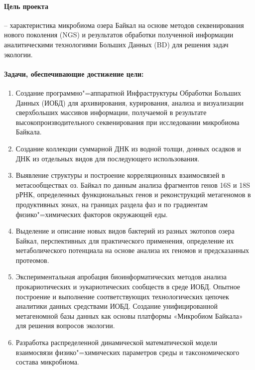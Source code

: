 \documentclass[a4paper,12pt,openany,final]{extreport}
\makeatletter
\def\vhrulefill#1{\leavevmode\leaders\hrule\@height#1\hfill \kern\z@}
\newcommand\toprule{\noindent\vhrulefill{2pt}}
\newcommand\bottomrule{\noindent\vhrulefill{2pt}}
\makeatother
\begin{document}
\paragraph{Цель проекта} \hspace{-1.5ex}-- характеристика микробиома озера Байкал на основе методов секвенирования нового поколения (NGS) и результатов обработки полученной информации аналитическими технологиями Больших Данных (BD) для решения задач экологии.

\paragraph{Задачи, обеспечивающие достижение цели:}
\begin{enumerate}
\item Создание программно"=аппаратной Инфраструктуры Обработки Больших Данных (ИОБД) для архивирования, курирования, анализа и визуализации сверхбольших массивов информации, получаемой в результате высокопроизводительного секвенирования при исследовании микробиома Байкала.

\item Создание коллекции суммарной ДНК из водной толщи, донных осадков и ДНК из отдельных видов для последующего использования.

\item Выявление структуры и построение корреляционных взаимосвязей в метасообществах оз. Байкал по данным анализа фрагментов генов 16S и 18S рРНК, определенных функциональных генов и реконструкций метагеномов в продуктивных зонах, на границах раздела фаз и по градиентам физико"=химических факторов окружающей еды.

\item Выделение и описание новых видов бактерий из разных экотопов озера Байкал, перспективных для практического применения, определение их метаболического потенциала на основе анализа их геномов и предсказанных протеомов.

\item Экспериментальная апробация биоинформатических методов анализа прокариотических и эукариотических сообществ в среде ИОБД. Опытное построение и выполнение соответствующих технологических цепочек аналитики данных средствами ИОБД. Создание унифицированной метагеномной базы данных как основы платформы «Микробиом Байкала» для решения вопросов экологии.

\item Разработка распределенной динамической математической модели взаимосвязи физико"=химических параметров среды и таксономического состава микробиома.\strut
\end{enumerate}
\clearpage{}
\end{document}

